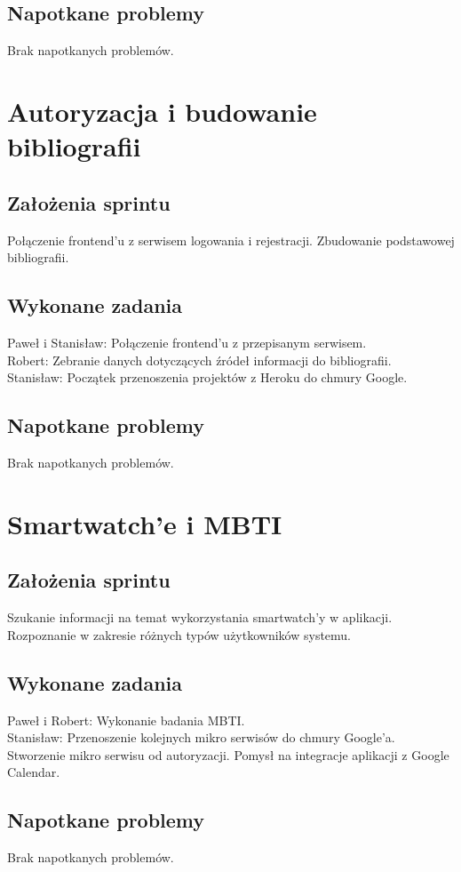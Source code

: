 \documentclass[a4paper,11pt]{report}
\begin{document}
\subsection {Napotkane problemy}
Brak napotkanych problemów.

\section {Autoryzacja i budowanie bibliografii}
\subsection {Założenia sprintu}
Połączenie frontend'u z serwisem logowania i rejestracji. Zbudowanie podstawowej bibliografii.
\subsection {Wykonane zadania}
Paweł i Stanisław: Połączenie frontend'u z przepisanym serwisem.\\
Robert: Zebranie danych dotyczących źródeł informacji do bibliografii.\\
Stanisław: Początek przenoszenia projektów z Heroku do chmury Google.\\
\subsection {Napotkane problemy}
Brak napotkanych problemów.

\section {Smartwatch'e i MBTI}
\subsection {Założenia sprintu}
Szukanie informacji na temat wykorzystania smartwatch'y w aplikacji. Rozpoznanie w zakresie różnych typów użytkowników systemu. 
\subsection {Wykonane zadania}
Paweł i Robert: Wykonanie badania MBTI.\\
Stanisław: Przenoszenie kolejnych mikro serwisów do chmury Google'a. Stworzenie mikro serwisu od autoryzacji. Pomysł na integracje aplikacji z Google Calendar.\\
\subsection {Napotkane problemy}
Brak napotkanych problemów.
\end{document}
